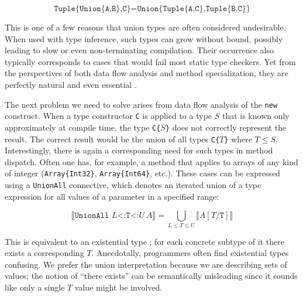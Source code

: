 \vspace{-3ex}
\[
\texttt{Tuple\{Union\{A,B\},C\}} = \texttt{Union\{Tuple\{A,C\},Tuple\{B,C\}\}}
\]

This is one of a few reasons that union types are often considered undesirable.
When used with type inference, such types can grow without bound, possibly leading
to slow or even non-terminating compilation. Their occurrence also typically
corresponds to cases that would fail most static type checkers. Yet from the
perspectives of both data flow analysis and method specialization, they are
perfectly natural and even essential
\cite{abstractinterp, Igarashi, Smith:2008:JTI:1449764.1449804}.

The next problem we need to solve arises from data flow analysis of
the \texttt{new} construct.
When a type constructor \texttt{C} is applied to a type
$S$ that is known only approximately at compile time, the type \texttt{C\{}$S$\texttt{\}}
does not correctly represent the result.
The correct result would be the union of all types \texttt{C\{}$T$\texttt{\}}
where $T\leq S$.
Interestingly, there is again a corresponding need for such types in method
dispatch. Often one has, for example, a method that applies to arrays of any
kind of integer (\texttt{Array\{Int32\}}, \texttt{Array\{Int64\}}, etc.).
These cases can be expressed using a \texttt{UnionAll} connective, which denotes
an iterated union of a type expression for all values of a parameter in a specified
range:

\vspace{-3ex}
\[
  \llbracket \texttt{UnionAll }L\texttt{<:T<:}U\ A \rrbracket = \bigcup_{L \leq T \leq U} \llbracket A[T/\texttt{T}] \rrbracket
\]


This is equivalent to an existential type \cite{boundedquant};
for each concrete subtype of it there exists a corresponding $T$.
Anecdotally, programmers often find existential types confusing.
We prefer the union interpretation because we are describing sets of values;
the notion of ``there exists'' can be semantically misleading since it sounds like
only a single $T$ value might be involved.


